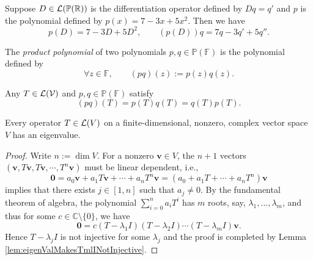 \begin{exm}
  Suppose $D\in {\cal L}(\mathbb{P}(\mathbb{R}))$
  is the differentiation operator defined
  by $Dq =q'$
  and $p$ is the polynomial defined by
  $p(x) = 7-3x + 5x^2$.
  Then we have
  \begin{displaymath}
    p(D) = 7-3D+5D^2, \qquad
    (p(D))q = 7q - 3q' + 5 q''.
  \end{displaymath}
\end{exm}

\begin{defn}
  \label{def:productPoly}
  The \emph{product polynomial} of two polynomials
  $p,q\in \mathbb{P}(\mathbb{F})$
  is the polynomial defined by
  \begin{equation}
    \label{eq:productPoly}
    \forall z\in \mathbb{F},\qquad
    (pq)(z) := p(z) q(z).
  \end{equation}
\end{defn}

\begin{lem}
  \label{lem:polyOpsCommutes}
  Any $T\in {\cal L}({\cal V})$ and $p,q\in \mathbb{P}(\mathbb{F})$
  satisfy
  \begin{equation}
    \label{eq:polyOpsCommutes}
      (pq)(T) = p(T)q(T) = q(T)p(T).
  \end{equation}
\end{lem}

\begin{thm}
  \label{thm:existenceOfEigenvalues}
  Every operator $T\in {\cal L}(V)$ on a finite-dimensional,
  nonzero, complex vector space $V$
  has an eigenvalue.
\end{thm}
\begin{proof}
  Write $n:=\dim V$.
  For a nonzero $\mathbf{v}\in V$,
  the $n+1$ vectors
  $(\mathbf{v}, T\mathbf{v}, T\mathbf{v}, \cdots, T^n\mathbf{v})$
  must be linear dependent, i.e., 
  \begin{displaymath}
    \mathbf{0}
    = a_0 \mathbf{v} + a_1T\mathbf{v} + \cdots + a_n T^n\mathbf{v}
    = (a_0 + a_1T + \cdots + a_n T^n)\mathbf{v}
  \end{displaymath}
  implies that there exists $j\in [1,n]$
  such that $a_j\ne 0$.
  By the fundamental theorem of algebra,
  the polynomial $\sum_{i=0}^n a_i T^i$
  has $m$ roots, say, $\lambda_1, \ldots, \lambda_m$,
  and thus for some $c\in\mathbb{C}\setminus\{0\}$,
  we have
  \begin{displaymath}
    \mathbf{0}=c (T-\lambda_1 I)(T-\lambda_2 I)\cdots (T-\lambda_m I)\mathbf{v}.
  \end{displaymath}
  Hence $T-\lambda_jI$ is not injective for some $\lambda_j$
  and the proof is completed by Lemma \ref{lem:eigenValMakesTmlINotInjective}.
\end{proof}

